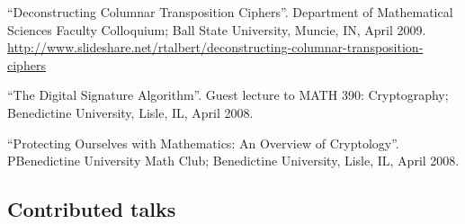 \documentclass[letterpaper]{article}
\renewenvironment{itemize}{
  \begin{list}{}{
    \setlength{\leftmargin}{1.5em}
	\setlength{\itemsep}{0in}
  }
}{
  \end{list}
}
\begin{document}
\begin{itemize}
	\item ``Deconstructing Columnar Transposition Ciphers''. Department of Mathematical Sciences Faculty Colloquium; Ball State University, Muncie, IN, April 2009. \url{http://www.slideshare.net/rtalbert/deconstructing-columnar-transposition-ciphers}
	\item ``The Digital Signature Algorithm''. Guest lecture to MATH 390: Cryptography; Benedictine University, Lisle, IL, April 2008.
	\item ``Protecting Ourselves with Mathematics: An Overview of Cryptology''. PBenedictine University Math Club; Benedictine University, Lisle, IL, April 2008.
\end{itemize}

\subsection*{Contributed talks}
\end{document}
